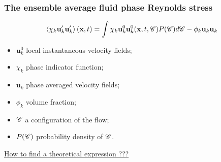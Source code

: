 \documentclass{sintefbeamer}
\begin{document}
\begin{frame}
  \frametitle{The ensemble average fluid phase Reynolds stress}
  \begin{equation*}
    \left<\chi_k \textbf{u}'_k\textbf{u}'_k\right>(\textbf{x},t)
    = \int  \chi_k \textbf{u}^0_k\textbf{u}^0_k(\textbf{x},t,\mathscr{C}) P(\mathscr{C})d\mathscr{C} 
    - \phi_k \textbf{u}_k\textbf{u}_k
\end{equation*}

\begin{itemize}
  \item $\textbf{u}_k^0$ local instantaneous velocity fields;
  \item $\chi_k$ phase indicator function;
  \item $\textbf{u}_k$ phase averaged velocity fields;
  \item $\phi_k$ volume fraction;
  \item $\mathscr{C}$ a configuration of the flow;
  \item $P(\mathscr{C})$ probability density of $\mathscr{C}$.
\end{itemize}


\underline{How to find a theoretical expression ??? }
\end{frame}
\end{document}
